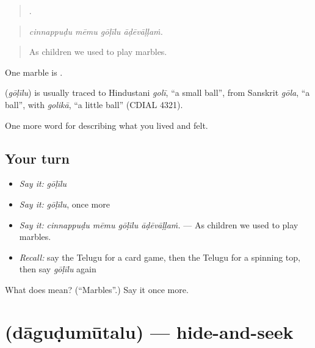\begin{quote}
   .
\end{quote}

\begin{quote}
\emph{cinnappuḍu mēmu gōḷīlu āḍēvāḷḷaṁ.}
\end{quote}

\begin{quote}
As children we used to play marbles.
\end{quote}

One marble is .

\begin{cousinweb}
\textbf{} (\emph{gōḷīlu}) is usually traced to Hindustani \emph{golī}, \textquotedblleft{}a small ball\textquotedblright{}, from Sanskrit \emph{gōla}, \textquotedblleft{}a ball\textquotedblright{}, with \emph{golikā}, \textquotedblleft{}a little ball\textquotedblright{} (CDIAL 4321).
\end{cousinweb}

\begin{grammarlens}[title={What you've built}]
One more word for describing what you lived and felt.
\end{grammarlens}

\subsection*{Your turn}
\begin{itemize}
\raggedright
  \item \emph{Say it:} \emph{gōḷīlu}
  \item \emph{Say it:} \emph{gōḷīlu}, once more
  \item \emph{Say it:} \emph{cinnappuḍu mēmu gōḷīlu āḍēvāḷḷaṁ.} — As children we used to play marbles.
  \item \emph{Recall:} say the Telugu for a card game, then the Telugu for a spinning top, then say \emph{gōḷīlu} again
\end{itemize}

\begin{tcolorbox}[breakable,colback=teal!4,colframe=teal!35!black,title={Before you move on}]
What does  mean? (\textquotedblleft{}Marbles\textquotedblright{}.) Say it once more.
\end{tcolorbox}
\section[\texorpdfstring{\te{దాగుడుమూతలు} (dāguḍumūtalu)}{దాగుడుమూతలు (dāguḍumūtalu)}]{ (dāguḍumūtalu) — hide-and-seek}

